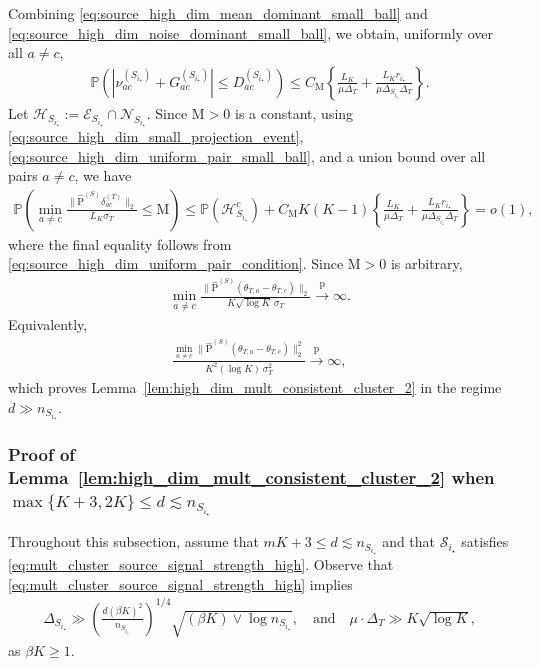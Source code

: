 \documentclass[10pt]{article}
\newcommand{\convp}{\xrightarrow{\mathrm{p}}}
\newcommand{\wh}{\widehat}
\newcommand{\trg}{T}
\newcommand{\sigmaT}{\sigma_{\trg}}
\newcommand{\thetamcT}[1]{\theta_{\trg,#1}}
\newcommand{\DeltaT}{\Delta_{\trg}}
\newcommand{\calS}{\mathcal S}
\newcommand{\src}{S}
\newcommand{\nSm}[1]{n_{\src_{#1}}}
\newcommand{\DeltaSm}[1]{\Delta_{\src_{#1}}}
\newcommand{\Pest}{\wh{\mathrm P}}
\begin{document}
Combining \eqref{eq:source_high_dim_mean_dominant_small_ball} and \eqref{eq:source_high_dim_noise_dominant_small_ball}, we obtain, uniformly over all $a\neq c$,
\begin{align}
\label{eq:source_high_dim_uniform_pair_small_ball}
    \mathbb P\left(|\nu_{ac}^{(\src_{i_\star})}+G_{ac}^{(\src_{i_\star})}|\le D_{ac}^{(\src_{i_\star})}\right)\le C_{\mathrm M}\left\{\frac{L_K}{\mu\DeltaT}+\frac{L_Kr_{i_\star}}{\mu\DeltaSm{i_\star}\DeltaT}\right\}.
\end{align}
Let $\mathcal H_{\src_{i_\star}}:=\mathcal E_{\src_{i_\star}}\cap\mathcal N_{\src_{i_\star}}$. Since $\mathrm M>0$ is a constant, using \eqref{eq:source_high_dim_small_projection_event}, \eqref{eq:source_high_dim_uniform_pair_small_ball}, and a union bound over all pairs $a\neq c$, we have
\begin{align}
\label{eq:source_high_dim_all_pairs_union_bound}
    \mathbb P\left(\min_{a\neq c}\frac{\|\Pest^{(\src)}\delta_{ac}^{(\trg)}\|_2}{L_K\sigmaT}\le \mathrm M\right)\le \mathbb P(\mathcal H_{\src_{i_\star}}^c)+C_{\mathrm M}K(K-1)\left\{\frac{L_K}{\mu\DeltaT}+\frac{L_Kr_{i_\star}}{\mu\DeltaSm{i_\star}\DeltaT}\right\}=o(1),
\end{align}
where the final equality follows from \eqref{eq:source_high_dim_uniform_pair_condition}. Since $\mathrm M>0$ is arbitrary,
\begin{align}
    \min_{a\neq c}\frac{\|\Pest^{(\src)}(\thetamcT{a}-\thetamcT{c})\|_2}{K\sqrt{\log K}\,\sigmaT}\convp\infty.
\end{align}
Equivalently,
\begin{align}
    \frac{\displaystyle \min_{a\neq c}\|\Pest^{(\src)}(\thetamcT{a}-\thetamcT{c})\|_2^2}{K^2(\log K)\,\sigmaT^2}\convp\infty,
\end{align}
which proves Lemma~\ref{lem:high_dim_mult_consistent_cluster_2} in the regime $d\gg \nSm{i_\star}$.


\subsubsection{Proof of Lemma~\ref{lem:high_dim_mult_consistent_cluster_2} when $ \max\{K+3,2K\}\le d\lesssim \nSm{i_\star}$}

Throughout this subsection, assume that $mK+3\le d\lesssim \nSm{i_\star}$ and that $\calS_{i_\star}$ satisfies \eqref{eq:mult_cluster_source_signal_strength_high}. Observe that \eqref{eq:mult_cluster_source_signal_strength_high} implies
\begin{align}
\label{eq:source_low_dim_necessary_condition}
    \DeltaSm{i_\star}\gg\left(\frac{d(\beta K)^2}{\nSm{i_\star}}\right)^{1/4}\sqrt{(\beta K) \vee \log \nSm{i_\star}}, \quad \text{and}\quad \mu\cdot\DeltaT\gg K\sqrt{\log K},
\end{align}
as $\beta K\ge 1$.
\end{document}
